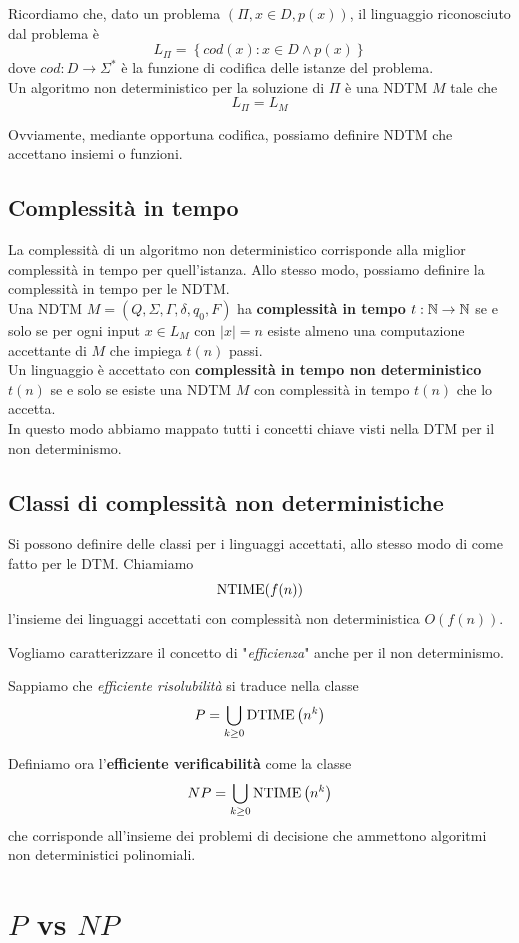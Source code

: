 Ricordiamo che, dato un problema $(\Pi, x \in D, p(x))$, il linguaggio riconosciuto dal problema è
$$ L_\Pi = \left\{cod(x): x \in D \wedge p(x) \right\} $$
dove $cod: D \rightarrow \Sigma^\ast$ è la funzione di codifica delle istanze del problema.\\

Un algoritmo non deterministico per la soluzione di $\Pi$ è una NDTM $M$ tale che
$$ L_\Pi = L_M $$

Ovviamente, mediante opportuna codifica, possiamo definire NDTM che accettano insiemi o funzioni.\\

\subsection{Complessità in tempo}

La complessità di un algoritmo non deterministico corrisponde alla miglior complessità in tempo per quell'istanza. Allo stesso modo, possiamo definire la complessità in tempo per le NDTM.\\

Una NDTM $M = (Q, \Sigma, \Gamma, \delta, q_0, F)$ ha \textbf{complessità in tempo} $t: \mathbb{N} \rightarrow \mathbb{N}$ se e solo se per ogni input $x \in L_M$ con $|x| = n$ esiste almeno una computazione accettante di $M$ che impiega $t(n)$ passi.\\

Un linguaggio è accettato con \textbf{complessità in tempo non deterministico} $t(n)$ se e solo se esiste una NDTM $M$ con complessità in tempo $t(n)$ che lo accetta.\\

In questo modo abbiamo mappato tutti i concetti chiave visti nella DTM per il non determinismo.\\

\subsection{Classi di complessità non deterministiche}

Si possono definire delle classi per i linguaggi accettati, allo stesso modo di come fatto per le DTM. Chiamiamo
$$ \text{NTIME} (f(n)) $$
l'insieme dei linguaggi accettati con complessità non deterministica $O(f(n))$.

Vogliamo caratterizzare il concetto di "\textit{efficienza}" anche per il non determinismo.

Sappiamo che \textit{efficiente risolubilità} si traduce nella classe 
$$ P = \bigcup_{k \geq 0} \text{DTIME} \left(n^k\right) $$

Definiamo ora l'\textbf{efficiente verificabilità} come la classe
$$ NP = \bigcup_{k \geq 0} \text{NTIME} \left(n^k\right) $$
che corrisponde all'insieme dei problemi di decisione che ammettono algoritmi non deterministici polinomiali.\\

\section{$P$ vs $NP$}
